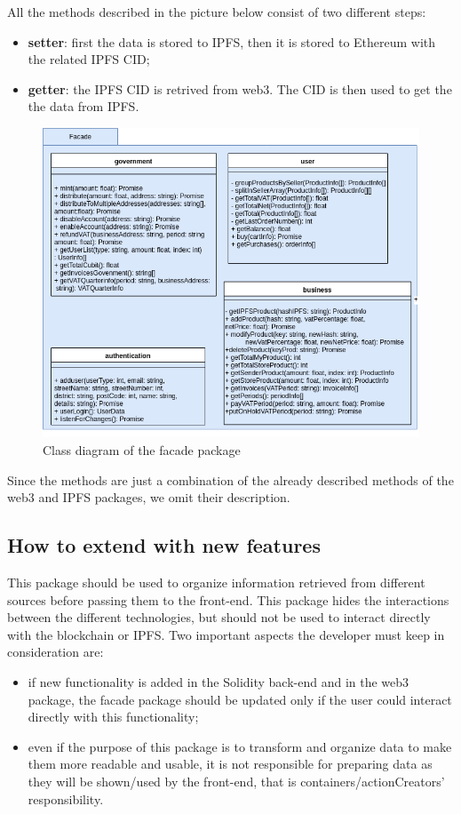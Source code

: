 All the methods described in the picture below consist of two different steps:
\begin{itemize}
	\item \textbf{setter}: first the data is stored to IPFS, then it is stored to Ethereum with the related IPFS CID;
	\item \textbf{getter}: the IPFS CID is retrived from web3. The CID is then used to get the the data from IPFS. 
\end{itemize}
\begin{figure}[h]
	\centering
	\includegraphics[scale=0.55]{res/images/facade-package.png}
	\caption{Class diagram of the facade package}
\end{figure}

\noindent Since the methods are just a combination of the already described methods of the web3 and IPFS packages, we omit their description.

\subsection{How to extend with new features}
This package should be used to organize information retrieved from different sources before passing them to the front-end. This package hides the interactions between the different technologies, but should not be used to interact directly with the blockchain or IPFS. Two important aspects the developer must keep in consideration are:
\begin{itemize}
	\item if new functionality is added in the Solidity back-end and in the web3 package, the facade package should be updated only if the user could interact directly with this functionality;
	\item even if the purpose of this package is to transform and organize data to make them more readable and usable, it is not responsible for preparing data as they will be shown/used by the front-end, that is containers/actionCreators' responsibility.
\end{itemize}

